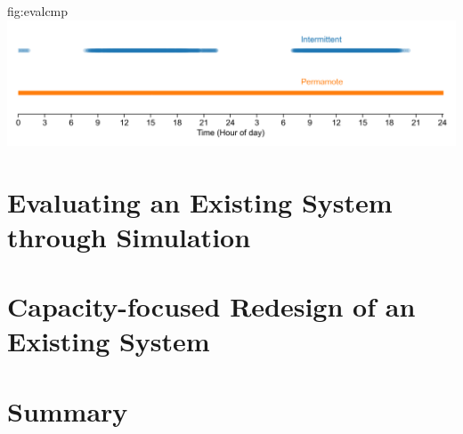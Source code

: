 \begin{definefigure}{fig:evalcmp}
    \centering
    \includegraphics[width=\linewidth]{figs/capacity/experiment_sys_compare/exp_packets_recv}
    \caption{
      \normalfont
        Packets received over two days.
      This figure compares the availability of an
      intermittent design and \name. \name sends a packet every second and does
      so without fail, while the intermittent system is only able to send when
      light is available.
      }
\end{definefigure}


\section{Evaluating an Existing System through Simulation}

\section{Capacity-focused Redesign of an Existing System}


\section{Summary}